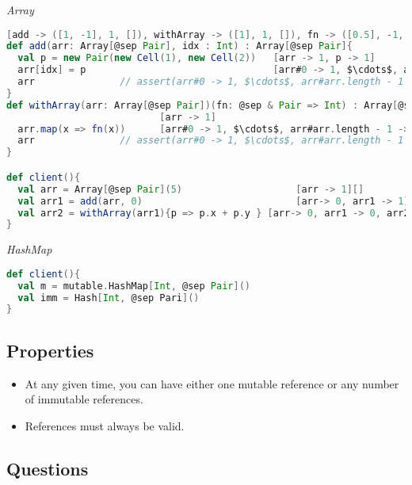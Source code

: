 \emph{Array}
\begin{lstlisting}[language=Scala,basicstyle=\footnotesize\ttfamily]
[add -> ([1, -1], 1, []), withArray -> ([1], 1, []), fn -> ([0.5], -1, [])]
def add(arr: Array[@sep Pair], idx : Int) : Array[@sep Pair]{
  val p = new Pair(new Cell(1), new Cell(2))   [arr -> 1, p -> 1]
  arr[idx] = p                                 [arr#0 -> 1, $\cdots$, arr#arr.length - 1 -> 1] 
  arr               // assert(arr#0 -> 1, $\cdots$, arr#arr.length - 1 -> 1)
}
def withArray(arr: Array[@sep Pair])(fn: @sep & Pair => Int) : Array[@sep Pair]{
                           [arr -> 1]
  arr.map(x => fn(x))      [arr#0 -> 1, $\cdots$, arr#arr.length - 1 -> 1]          
  arr               // assert(arr#0 -> 1, $\cdots$, arr#arr.length - 1 -> 1)
}

def client(){
  val arr = Array[@sep Pair](5)                    [arr -> 1][]
  val arr1 = add(arr, 0)                           [arr-> 0, arr1 -> 1][]
  val arr2 = withArray(arr1){p => p.x + p.y } [arr-> 0, arr1 -> 0, arr2 -> 1][]
}
\end{lstlisting}

\emph{HashMap}
\begin{lstlisting}[language=Scala,basicstyle=\footnotesize\ttfamily]
def client(){
  val m = mutable.HashMap[Int, @sep Pair]()
  val imm = Hash[Int, @sep Pari]()
}
\end{lstlisting}

\clearpage
\subsection{Properties}
\begin{itemize}
\item At any given time, you can have either one mutable reference or any number of immutable references.
\item References must always be valid.
\end{itemize}

\subsection{Questions}
%
%

%







 


